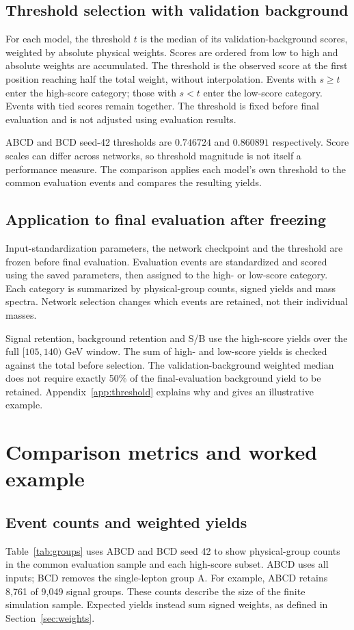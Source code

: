 \documentclass[11pt,a4paper]{article}
\begin{document}
\subsection{Threshold selection with validation background}\label{sec:threshold}
For each model, the threshold $t$ is the median of its validation-background scores, weighted by absolute physical weights.
Scores are ordered from low to high and absolute weights are accumulated.
The threshold is the observed score at the first position reaching half the total weight, without interpolation.
Events with $s\geq t$ enter the high-score category; those with $s<t$ enter the low-score category. Events with tied scores remain together.
The threshold is fixed before final evaluation and is not adjusted using evaluation results.

ABCD and BCD seed-42 thresholds are $0.746724$ and $0.860891$ respectively.
Score scales can differ across networks, so threshold magnitude is not itself a performance measure.
The comparison applies each model's own threshold to the common evaluation events and compares the resulting yields.

\subsection{Application to final evaluation after freezing}
Input-standardization parameters, the network checkpoint and the threshold are frozen before final evaluation.
Evaluation events are standardized and scored using the saved parameters, then assigned to the high- or low-score category. Each category is summarized by physical-group counts, signed yields and mass spectra.
Network selection changes which events are retained, not their individual masses.

Signal retention, background retention and S/B use the high-score yields over the full $[105,140)$ GeV window.
The sum of high- and low-score yields is checked against the total before selection.
The validation-background weighted median does not require exactly 50\% of the final-evaluation background yield to be retained. Appendix~\ref{app:threshold} explains why and gives an illustrative example.

\section{Comparison metrics and worked example}\label{sec:basic}

\subsection{Event counts and weighted yields}
Table~\ref{tab:groups} uses ABCD and BCD seed 42 to show physical-group counts in the common evaluation sample and each high-score subset.
ABCD uses all inputs; BCD removes the single-lepton group A.
For example, ABCD retains 8,761 of 9,049 signal groups.
These counts describe the size of the finite simulation sample. Expected yields instead sum signed weights, as defined in Section~\ref{sec:weights}.
\end{document}
